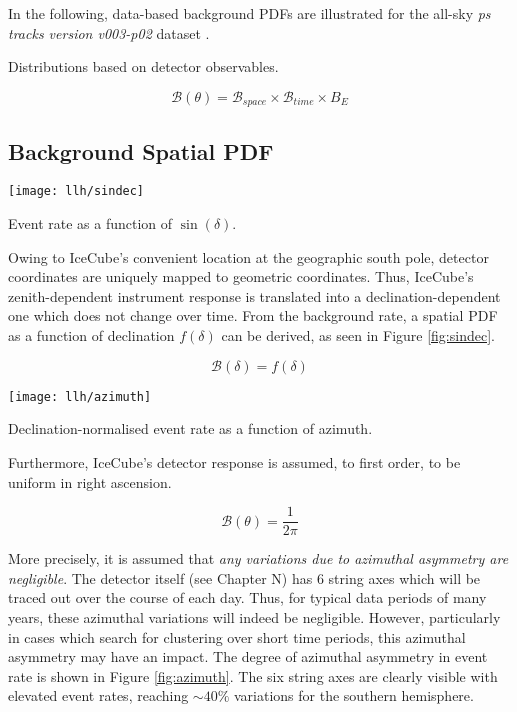 In the following, data-based background PDFs are illustrated for the all-sky \emph{ps tracks version v003-p02} dataset .

Distributions based on detector observables.

\begin{equation}
\mathcal{B} (\theta) = \mathcal{B}_{space} \times \mathcal{B}_{time}  \times {B}_{E}
\end{equation}

\subsection{Background Spatial PDF}

\begin{marginfigure}
	\centering \texttt{[image: llh/sindec]}
	\caption{Event rate as a function of $\sin(\delta)$.}
	\label{fig:sindec}
\end{marginfigure}

Owing to IceCube's convenient location at the geographic south pole, detector coordinates are uniquely mapped to geometric coordinates. Thus, IceCube's zenith-dependent instrument response is translated into a declination-dependent one which does not change over time. From the background rate, a spatial PDF as a function of declination $ f(\delta)$ can be derived, as seen in Figure \ref{fig:sindec}.

\begin{equation}
	\mathcal{B} (\delta) = f(\delta)
\end{equation}

\begin{marginfigure}
	\centering \texttt{[image: llh/azimuth]}
	\caption{Declination-normalised event rate as a function of azimuth.}
	\label{fig:azimuth}
\end{marginfigure}

Furthermore, IceCube's detector response is assumed, to first order, to be uniform in right ascension.

\begin{equation}
\mathcal{B} (\theta) = \frac{1}{2\pi} 
\end{equation}

More precisely, it is assumed that \emph{any variations due to azimuthal asymmetry are negligible}. The detector itself (see Chapter N) has 6 string axes which will be traced out over the course of each day. Thus, for typical data periods of many years, these azimuthal variations will indeed be negligible. However, particularly in cases which search for clustering over short time periods, this azimuthal asymmetry may have an impact. The degree of azimuthal asymmetry in event rate is shown in Figure \ref{fig:azimuth}.  The six string axes are clearly visible with elevated event rates, reaching $\sim40\%$ variations for the southern hemisphere.

